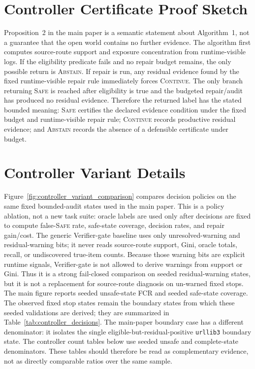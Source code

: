 \documentclass[letterpaper,10pt]{article}
\newcommand{\safe}{\textsc{Safe}}
\newcommand{\cont}{\textsc{Continue}}
\newcommand{\abstain}{\textsc{Abstain}}
\begin{document}
\section*{Controller Certificate Proof Sketch}

Proposition~2 in the main paper is a semantic statement about
Algorithm~1, not a guarantee that the open world contains no further evidence.
The algorithm first computes source-route support and exposure concentration
from runtime-visible logs. If the eligibility predicate fails and no repair
budget remains, the only possible return is \abstain{}. If repair is run, any
residual evidence found by the fixed runtime-visible repair rule immediately
forces \cont{}. The only branch returning \safe{} is reached after eligibility is
true and the budgeted repair/audit has produced no residual evidence. Therefore
the returned label has the stated bounded meaning: \safe{} certifies the
declared evidence condition under the fixed budget and runtime-visible repair
rule; \cont{} records productive residual evidence; and \abstain{} records the
absence of a defensible certificate under budget.

\section*{Controller Variant Details}

Figure~\ref{fig:controller_variant_comparison} compares decision policies on the
same fixed bounded-audit states used in the main paper. This is a policy
ablation, not a new task suite: oracle labels are used only after decisions are
fixed to compute false-\safe{} rate, safe-state coverage, decision rates, and
repair gain/cost. The generic Verifier-gate baseline uses only
unresolved-warning and residual-warning bits; it never reads source-route
support, Gini, oracle totals, recall, or undiscovered true-item counts.
Because those warning bits are explicit runtime signals, Verifier-gate is not
allowed to derive warnings from support or Gini. Thus it is a strong fail-closed
comparison on seeded residual-warning states, but it is not a replacement for
source-route diagnosis on un-warned fixed stops. The main figure reports seeded
unsafe-state FCR and seeded safe-state coverage.
The observed fixed stop states remain the boundary states from which these
seeded validations are derived; they are summarized in
Table~\ref{tab:controller_decisions}.
The main-paper boundary case has a different denominator: it isolates the single
eligible-but-residual-positive \texttt{urllib3} boundary state. The controller
count tables below use seeded unsafe and complete-state denominators. These
tables should therefore be read as complementary evidence, not as directly
comparable ratios over the same sample.
\end{document}
